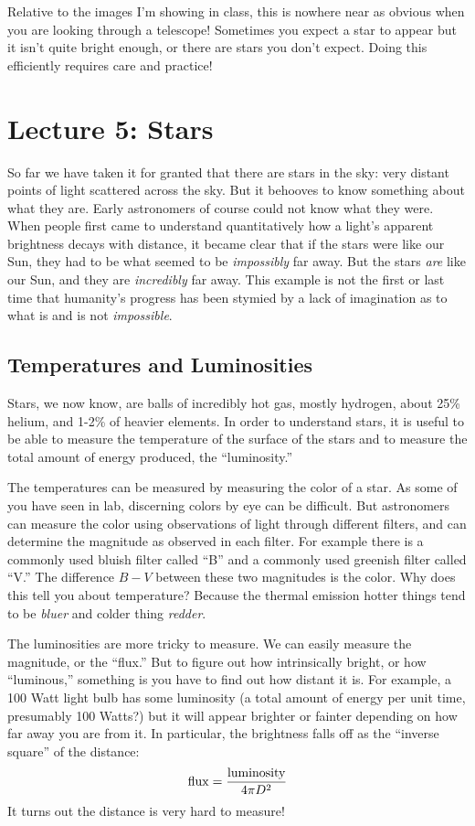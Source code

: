 \documentclass[12pt, preprint]{aastex}
\begin{document}
Relative to the images I'm showing in class, this is nowhere near as
obvious when you are looking through a telescope! Sometimes you expect
a star to appear but it isn't quite bright enough, or there are stars
you don't expect. Doing this efficiently requires care and practice!

\clearpage

\section{Lecture 5: Stars}

So far we have taken it for granted that there are stars in the sky:
very distant points of light scattered across the sky. But it behooves
to know something about what they are. Early astronomers of course
could not know what they were. When people first came to understand
quantitatively how a light's apparent brightness decays with distance,
it became clear that if the stars were like our Sun, they had to be
what seemed to be {\it impossibly} far away. But the stars {\it are}
like our Sun, and they are {\it incredibly} far away. This example is
not the first or last time that humanity's progress has been stymied
by a lack of imagination as to what is and is not {\it impossible}.

\subsection{Temperatures and Luminosities}

Stars, we now know, are balls of incredibly hot gas, mostly hydrogen,
about 25\% helium, and 1-2\% of heavier elements. In order to
understand stars, it is useful to be able to measure the temperature
of the surface of the stars and to measure the total amount of energy
produced, the ``luminosity.''

The temperatures can be measured by measuring the color of a star. As
some of you have seen in lab, discerning colors by eye can be
difficult. But astronomers can measure the color using observations of
light through different filters, and can determine the magnitude as
observed in each filter. For example there is a commonly used bluish
filter called ``B'' and a commonly used greenish filter called ``V.''
The difference $B-V$ between these two magnitudes is the color.  Why
does this tell you about temperature? Because the thermal emission
hotter things tend to be {\it bluer} and colder thing {\it redder}.

The luminosities are more tricky to measure. We can easily measure the
magnitude, or the ``flux.'' But to figure out how intrinsically
bright, or how ``luminous,'' something is you have to find out how
distant it is. For example, a 100 Watt light bulb has some luminosity
(a total amount of energy per unit time, presumably 100 Watts?) but it
will appear brighter or fainter depending on how far away you are from
it. In particular, the brightness falls off as the ``inverse square''
of the distance:
\begin{equation}
{\rm flux} = \frac{{\rm luminosity}}{4\pi D^2}
\end{equation}
It turns out the distance is very hard to measure!
\end{document}
